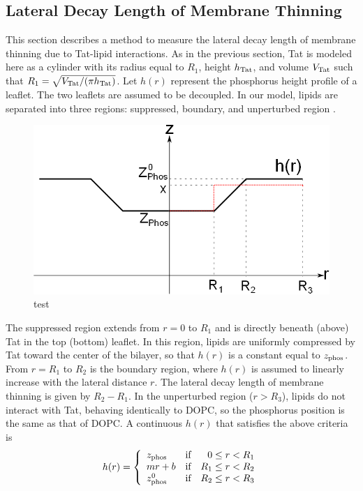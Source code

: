 \subsection{Lateral Decay Length of Membrane Thinning}
This section describes a method to measure the lateral decay length
of membrane thinning due to Tat-lipid interactions. 
As in the previous section, Tat is modeled here as a cylinder with 
its radius equal to $R_1$, height $h_\mathrm{Tat}$,
and volume $V_\textrm{Tat}$ such that $R_1=\sqrt{V_\textrm{Tat}/(\pi h_\mathrm{Tat})}$. 
Let $h(r)$ represent the phosphorus height profile
of a leaflet. The two leaflets are assumed to be decoupled.
In our model, lipids are separated into three regions: 
suppressed, boundary, and unperturbed region . 
\begin{figure}[htbp]
  \centering
  \includegraphics[scale=0.5]{./figures/Tat/linear_model.png}
  \caption{test}
  \label{fig:linear_model}
\end{figure}
The suppressed region extends from $r=0$ to $R_1$ and is directly beneath 
(above) Tat in the top (bottom) leaflet. In this region, lipids are uniformly 
compressed by Tat toward the 
center of the bilayer, so that $h(r)$ is a constant equal to $z_\textrm{phos}$. 
From $r=R_1$ to $R_2$ is the boundary region, where $h(r)$ is assumed to 
linearly increase with the lateral distance $r$. The lateral decay length
of membrane thinning is given by $R_2-R_1$. 
In the unperturbed region ($r>R_3$), lipids do not interact with 
Tat, behaving identically to DOPC, so the phosphorus position is the same as that of 
DOPC. A continuous $h(r)$ that 
satisfies the above criteria is
\begin{equation}
  h(r) = \left\{ 
  \begin{array}{lcr}
    z_\textrm{phos}   & \text{if} & 0   \leq r < R_1 \\
    mr+b     & \text{if} & R_1 \leq r < R_2 \\
    z_\textrm{phos}^0 & \text{if} & R_2 \leq r < R_3 
  \end{array}\right.  
\end{equation}     
